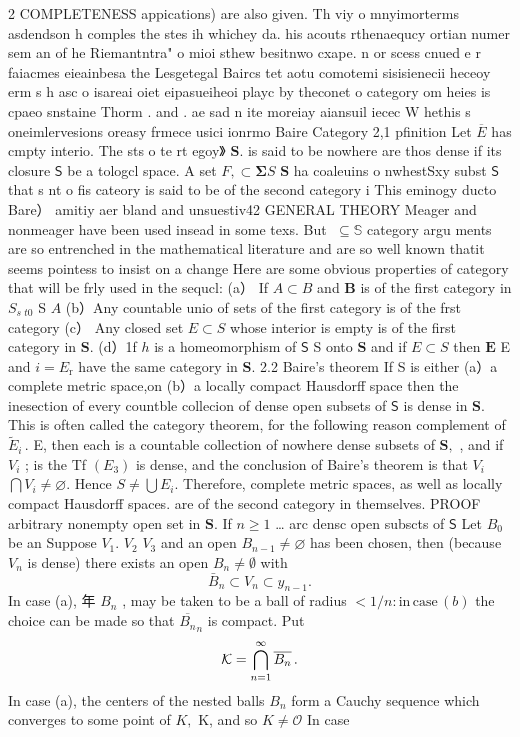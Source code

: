 2 COMPLETENESS appications) are also given. Th viy o mnyimorterms asdendson h comples the stes ih whichey da. his acouts rthenaequcy ortian numer sem an of he Riemantntra" o mioi sthew besitnwo cxape. n or scess cnued e r faiacmes eieainbesa the Lesgetegal Baircs tet aotu comotemi sisisienecii heceoy erm s h asc o isareai oiet eipasueiheoi playc by theconet o category om heies is cpaeo snstaine Thorm . and . ae sad n ite moreiay aiansuil iecec W hethis s oneimlervesions oreasy frmece usici ionrmo Baire Category 2,1 pfinition Let $\overline{{E}}$ has cmpty interio. The sts o te rt egoy》 ${\boldsymbol{S}}.$ is said to be nowhere are thos dense if its closure $\boldsymbol{\mathsf{S}}$ be a tologcl space. A set $F,\subset\mathbf{\Sigma}S$ $\boldsymbol{S}$ ha coaleuins o nwhestSxy subst $\boldsymbol{\mathsf{S}}$ that s nt o fis cateory is said to be of the second category i This eminogy ducto Bare） amitiy aer bland and unsuestiv42 GENERAL THEORY Meager and nonmeager have been used insead in some texs. But $\;\subseteq\mathbb{S}$ category argu ments are so entrenched in the mathematical literature and are so well known thatit seems pointess to insist on a change Here are some obvious properties of category that will be frly used in the sequcl: (a） If $A\subset B$ and $\boldsymbol{B}$ is of the first category in $S_{s}\,_{t0}$ S $\textstyle A$ (b）Any countable unio of sets of the first category is of the frst category (c） Any closed set $\scriptstyle{E\subset S}$ whose interior is empty is of the first category in $\mathbf{S}.$ (d）1f $\boldsymbol{\mathit{h}}$ is a homeomorphism of $\boldsymbol{\mathsf{S}}$ S onto $\boldsymbol{S}$ and if $E\subset S$ then $\boldsymbol{E}$ E and $\scriptstyle i=E_{\mathrm{r}}$ have the same category in $\mathbf{S}.$ 2.2 Baire's theorem If S is either (a）a complete metric space,on (b）a locally compact Hausdorff space then the inesection of every countble collecion of dense open subsets of $\boldsymbol{\mathsf{S}}$ is dense in $\mathbf{S}.$ This is often called the category theorem, for the following reason complement of ${\widetilde{E}}_{i}\,.$ E, then each is a countable collection of nowhere dense subsets of $\mathbf{S},$ , and if $V_{i}$ ; is the Tf $(E_{\mathrm{{3}}})$ is dense, and the conclusion of Baire's theorem is that $V_{i}$ $\bigcap{V_{i}}\neq\varnothing.$ Hence $S\neq\bigcup E_{i}.$ Therefore, complete metric spaces, as well as locally compact Hausdorff spaces. are of the second category in themselves. PROOF arbitrary nonempty open set in $\mathbf{S}.$ If $\scriptstyle n\geq1$ … arc densc open subscts of $\boldsymbol{\mathsf{S}}$ Let $B_{0}$ be an Suppose $V_{1}.$ $V_{\mathrm{2}}$ $V_{\mathrm{3}}$ and an open $B_{n-1}\neq\varnothing$ has been chosen, then (because $V_{n}$ is dense) there exists an open $B_{n}\neq\emptyset$ with $$ \bar{B}_{n}\subset V_{n}\subset y_{n-1}. $$ In case (a), 年 $B_{n}$ , may be taken to be a ball of radius $<1/n\colon\mathrm{in}\,\mathrm{case}\,(b)$ the choice can be made so that ${\overline{{B_{n}}}}_{n}$ is compact. Put $$ {\cal K}=\bigcap_{n=1}^{\infty}\overline{{{B_{n}}}}\,. $$ In case (a), the centers of the nested balls $\textstyle B_{n}$ form a Cauchy sequence which converges to some point of $K,$ K, and so $K\neq{\mathcal{O}}$ In case 